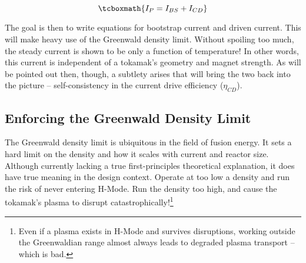 \begin{equation}
	\label{eq:ibal}
	\tcboxmath{
	I_P = I_{BS} + I_{CD}
	}
\end{equation}

The goal is then to write equations for bootstrap current and driven current. This will make heavy use of the Greenwald density limit. Without spoiling too much, the steady current is shown to be only a function of temperature! In other words, this current is independent of a tokamak's geometry and magnet strength. As will be pointed out then, though, a subtlety arises that will bring the two back into the picture -- self-consistency in the current drive efficiency ($\eta_{CD}$).

\subsection{Enforcing the Greenwald Density Limit}

The Greenwald density limit is ubiquitous in the field of fusion energy. It sets a hard limit on the density and how it scales with current and reactor size. Although currently lacking a true first-principles theoretical explanation, it does have true meaning in the design context. Operate at too low a density and run the risk of never entering H-Mode. Run the density too high, and cause the tokamak's plasma to disrupt catastrophically!\footnote{Even if a plasma exists in H-Mode and survives disruptions, working outside the Greenwaldian range almost always leads to degraded plasma transport -- which is bad.}

